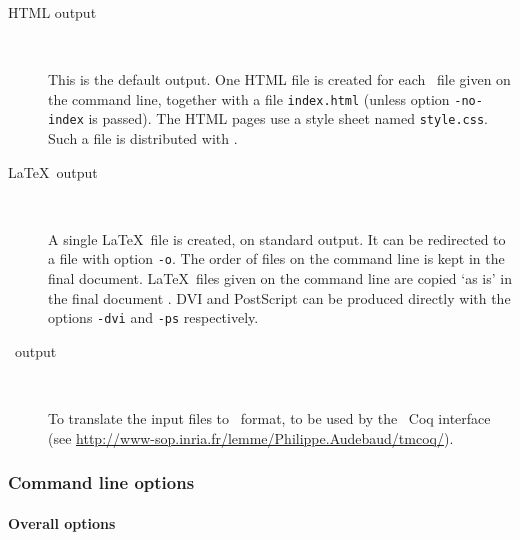 \begin{description}
\item[HTML output] ~\par
  This is the default output.
  One HTML file is created for each \Coq\ file given on the command line,
  together with a file \texttt{index.html} (unless option
  \texttt{-no-index} is passed). The HTML pages use a style sheet
  named \texttt{style.css}. Such a file is distributed with \coqdoc.

\item[\LaTeX\ output] ~\par
  A single \LaTeX\ file is created, on standard output. It can be
  redirected to a file with option \texttt{-o}. 
  The order of files on the command line is kept in the final
  document. \LaTeX\ files given on the command line are copied `as is'
  in the final document .
  DVI and PostScript can be produced directly with the options
  \texttt{-dvi} and \texttt{-ps} respectively.

\item[\texmacs\ output] ~\par
  To translate the input files to \texmacs\ format, to be used by
  the \texmacs\ Coq interface 
  (see \url{http://www-sop.inria.fr/lemme/Philippe.Audebaud/tmcoq/}).
\end{description}


\subsubsection*{Command line options}


\paragraph{Overall options}

